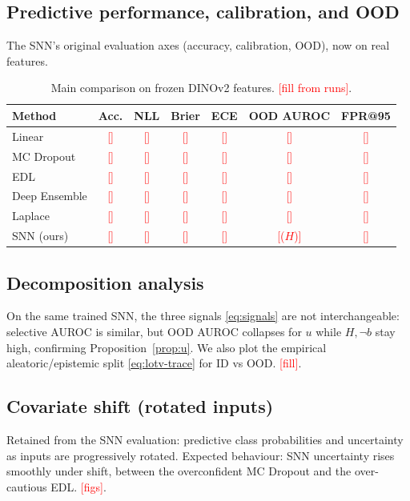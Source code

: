 \documentclass[11pt]{article}
\newcommand{\todo}[1]{\textcolor{red}{[#1]}}
\begin{document}
\subsection{Predictive performance, calibration, and OOD}
The SNN's original evaluation axes (accuracy, calibration, OOD), now on real features.
\begin{table}[h]\centering
\caption{Main comparison on frozen DINOv2 features. \todo{fill from runs}.}
\begin{tabular}{lcccccc}
\toprule
Method & Acc. & NLL & Brier & ECE & OOD AUROC & FPR@95 \\
\midrule
Linear & \todo{} & \todo{} & \todo{} & \todo{} & \todo{} & \todo{} \\
MC Dropout & \todo{} & \todo{} & \todo{} & \todo{} & \todo{} & \todo{} \\
EDL & \todo{} & \todo{} & \todo{} & \todo{} & \todo{} & \todo{} \\
Deep Ensemble & \todo{} & \todo{} & \todo{} & \todo{} & \todo{} & \todo{} \\
Laplace & \todo{} & \todo{} & \todo{} & \todo{} & \todo{} & \todo{} \\
SNN (ours) & \todo{} & \todo{} & \todo{} & \todo{} & \todo{($H$)} & \todo{} \\
\bottomrule
\end{tabular}
\end{table}

\subsection{Decomposition analysis}
On the same trained SNN, the three signals \eqref{eq:signals} are not interchangeable:
selective AUROC is similar, but OOD AUROC collapses for $u$ while $H,\neg b$ stay high,
confirming Proposition~\ref{prop:u}. We also plot the empirical
aleatoric/epistemic split \eqref{eq:lotv-trace} for ID vs OOD. \todo{fill}.

\subsection{Covariate shift (rotated inputs)}
Retained from the SNN evaluation: predictive class probabilities and uncertainty as
inputs are progressively rotated. Expected behaviour: SNN uncertainty rises smoothly
under shift, between the overconfident MC Dropout and the over-cautious EDL. \todo{figs}.
\end{document}
